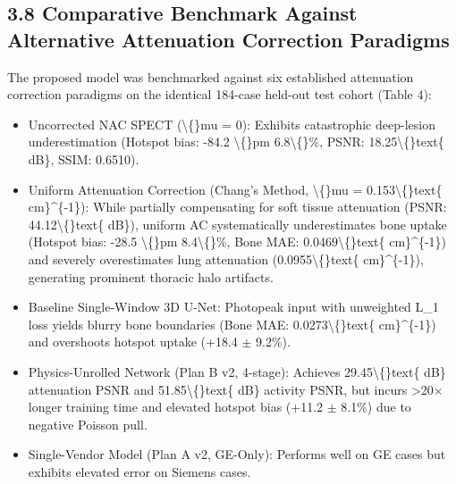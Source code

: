 \documentclass[11pt]{article}
\begin{document}
\subsection*{3.8 Comparative Benchmark Against Alternative Attenuation Correction Paradigms}
The proposed model was benchmarked against six established attenuation correction paradigms on the identical 184-case held-out test cohort (Table 4):\par

\begin{itemize}\item  Uncorrected NAC SPECT (\textbackslash\{\}mu = 0): Exhibits catastrophic deep-lesion underestimation (Hotspot bias: -84.2 \textbackslash\{\}pm 6.8\textbackslash\{\}\%, PSNR: 18.25\textbackslash\{\}text\{ dB\}, SSIM: 0.6510).\end{itemize}
\begin{itemize}\item  Uniform Attenuation Correction (Chang's Method, \textbackslash\{\}mu = 0.153\textbackslash\{\}text\{ cm\}\textasciicircum{}\{-1\}): While partially compensating for soft tissue attenuation (PSNR: 44.12\textbackslash\{\}text\{ dB\}), uniform AC systematically underestimates bone uptake (Hotspot bias: -28.5 \textbackslash\{\}pm 8.4\textbackslash\{\}\%, Bone MAE: 0.0469\textbackslash\{\}text\{ cm\}\textasciicircum{}\{-1\}) and severely overestimates lung attenuation (0.0955\textbackslash\{\}text\{ cm\}\textasciicircum{}\{-1\}), generating prominent thoracic halo artifacts.\end{itemize}
\begin{itemize}\item  Baseline Single-Window 3D U-Net: Photopeak input with unweighted L\_1 loss yields blurry bone boundaries (Bone MAE: 0.0273\textbackslash\{\}text\{ cm\}\textasciicircum{}\{-1\}) and overshoots hotspot uptake (+18.4 $\pm$ 9.2\%).\end{itemize}
\begin{itemize}\item  Physics-Unrolled Network (Plan B v2, 4-stage): Achieves 29.45\textbackslash\{\}text\{ dB\} attenuation PSNR and 51.85\textbackslash\{\}text\{ dB\} activity PSNR, but incurs >20$\times$ longer training time and elevated hotspot bias (+11.2 $\pm$ 8.1\%) due to negative Poisson pull.\end{itemize}
\begin{itemize}\item  Single-Vendor Model (Plan A v2, GE-Only): Performs well on GE cases but exhibits elevated error on Siemens cases.\end{itemize}
\end{document}
